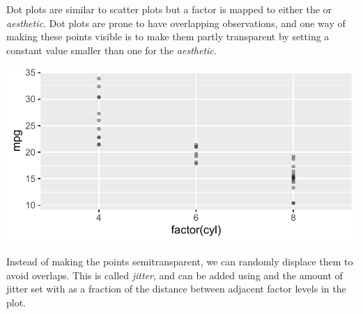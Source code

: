 \documentclass[krantz2]{krantz}\usepackage{knitr}
\begin{document}
Dot plots are similar to scatter plots but a factor is mapped to either the  or  \emph{aesthetic}. Dot plots are prone to have overlapping observations, and one way of making these points visible is to make them partly transparent by setting a constant value smaller than one for the  \emph{aesthetic}.

\begin{knitrout}\footnotesize
{}\color{fgcolor}\begin{kframe}
\begin{alltt}
\hlstd{(}  \hlstd{(} \hlstd{=}    \hlopt{+}
  \hlstd{(} \hlstd{=} \hlopt{/}\hlstd{)}
\end{alltt}
\end{kframe}

{\centering \includegraphics[width=.7\textwidth]{figure/pos-scatter-12a-1}

}



\end{knitrout}

Instead of making the points semitransparent, we can randomly displace them to avoid overlaps. This is called \emph{jitter}, and can be added using  and the amount of jitter set with  as a fraction of the distance between adjacent factor levels in the plot.

\begin{knitrout}\footnotesize
{}\color{fgcolor}\begin{kframe}
\begin{alltt}
\hlstd{(}  \hlstd{(} \hlstd{=}    \hlopt{+}
  \hlstd{(} \hlstd{=} \hlstd{(} \hlstd{=} \hlstd{))}
\end{alltt}
\end{kframe}
\end{knitrout}
\end{document}
